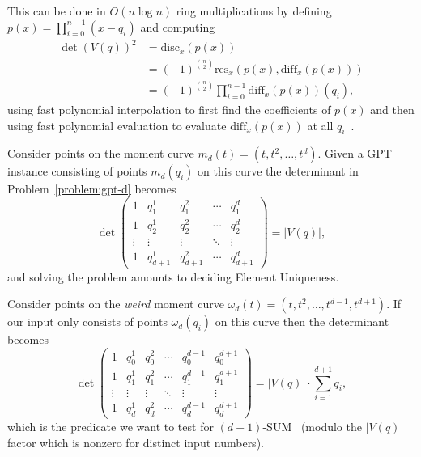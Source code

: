 This can be done in \(O(n \log n)\) ring multiplications
by defining
%
\(p(x) = \prod_{i=0}^{n-1} (x-q_i)\)
%
and computing
%
\begin{align*}
{\det(V(q))}^2 &= \mathrm{disc}_x(p(x)) \\
&= {(-1)}^{\binom{n}{2}} \mathrm{res}_x(p(x), \mathrm{diff}_x(p(x))) \\
&= {(-1)}^{\binom{n}{2}} \prod_{i=0}^{n-1} \mathrm{diff}_x(p(x))(q_i),
\end{align*}
%
using fast polynomial interpolation to first find the coefficients of
\(p(x)\) and then using fast polynomial evaluation to evaluate
\(\mathrm{diff}_x(p(x))\) at all \(q_i\)~\cite{St73,Ku73a,Ku73b,ASU75}.

Consider points on the moment curve $m_d(t) = (t, t^2, \ldots, t^d)$. Given a
GPT instance consisting of points $m_d(q_i)$ on this curve the determinant
in Problem~\ref{problem:gpt-d} becomes
%
\begin{displaymath}
\det\begin{pmatrix}
1      & q_1^1 & q_1^2 & \cdots & q_1^d \\
1      & q_2^1 & q_2^2 & \cdots & q_2^d \\
\vdots & \vdots  & \vdots  & \ddots & \vdots  \\
1      & q_{d+1}^1 & q_{d+1}^2 & \cdots & q_{d+1}^d
\end{pmatrix}
=
|V(q)|,
\end{displaymath}
and solving the problem amounts to deciding Element Uniqueness.

Consider points on the \emph{weird} moment curve $\omega_d(t) = (t, t^2, \ldots,
t^{d-1}, t^{d+1})$.
If our input only consists of points $\omega_d(q_i)$ on this curve then the
determinant becomes
%
\begin{displaymath}
\det\begin{pmatrix}
1      & q_0^1 & q_0^2 & \cdots & q_0^{d-1} & q_0^{d+1} \\
1      & q_1^1 & q_1^2 & \cdots & q_1^{d-1} & q_1^{d+1} \\
\vdots & \vdots  & \vdots  & \ddots & \vdots & \vdots  \\
1      & q_d^1 & q_d^2 & \cdots & q_d^{d-1} & q_d^{d+1}
\end{pmatrix} = |V(q)| \cdot \sum_{i=1}^{d+1} q_i,
\end{displaymath}
%
which is the predicate we want to test for $(d+1)$-SUM~\cite{Er99b}
(modulo the $|V(q)|$ factor which is nonzero for distinct input numbers).

